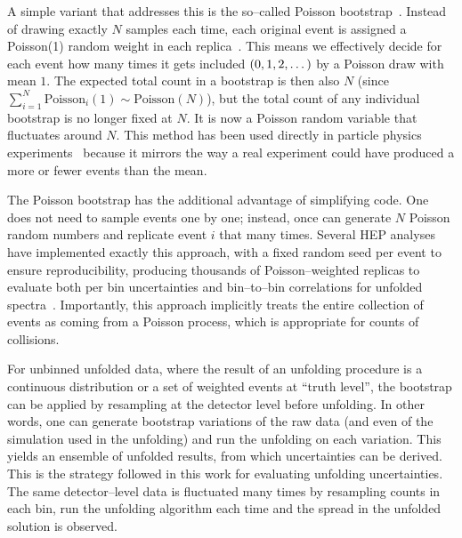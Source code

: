             A simple variant that addresses this is the so--called Poisson bootstrap~\cite{rubin_bayesian_1981, praestgaard_exchangeably_1993}.
            Instead of drawing exactly $N$ samples each time, each original event is assigned a Poisson(1) random weight in each replica~\cite{Lyons:2011cli, Bohm:2013gla}.
            This means we effectively decide for each event how many times it gets included \(\qty(0, 1, 2,\dots)\) by a Poisson draw with mean \(1\).
            The expected total count in a bootstrap is then also $N$ (since $\sum_{i=1}^N \text{Poisson}_i(1) \sim \text{Poisson}(N)$), but the total count of any individual bootstrap is no longer fixed at \(N\).
            It is now a Poisson random variable that fluctuates around $N$.
            This method has been used directly in particle physics experiments~\cite{ATLAS:2025ztg, Favaro:2025psi} because it mirrors the way a real experiment could have produced a more or fewer events than the mean.
            
            The Poisson bootstrap has the additional advantage of simplifying code.
            One does not need to sample events one by one;
            instead, once can generate $N$ Poisson random numbers and replicate event $i$ that many times.
            Several HEP analyses have implemented exactly this approach, with a fixed random seed per event to ensure reproducibility, producing thousands of Poisson--weighted replicas to evaluate both per bin uncertainties and bin--to--bin correlations for unfolded spectra~\cite{ATLAS:2024tqe, ATLAS:2023qzf, ATLAS:2021kho, Manole:2022bmi, STAR:2022etb, CMS:2018sxu, Kuusela2015StatisticalQuantification, Burgers:1989pm}.
            Importantly, this approach implicitly treats the entire collection of events as coming from a Poisson process, which is appropriate for counts of collisions.

            For unbinned unfolded data, where the result of an unfolding procedure is a continuous distribution or a set of weighted events at ``truth level'', the bootstrap can be applied by resampling at the detector level before unfolding.
            In other words, one can generate bootstrap variations of the raw data (and even of the simulation used in the unfolding) and run the unfolding on each variation.
            This yields an ensemble of unfolded results, from which uncertainties can be derived.
            This is the strategy followed in this work for evaluating unfolding uncertainties.
            The same detector--level data is fluctuated many times by resampling counts in each bin, run the unfolding algorithm each time and the spread in the unfolded solution is observed.
            
